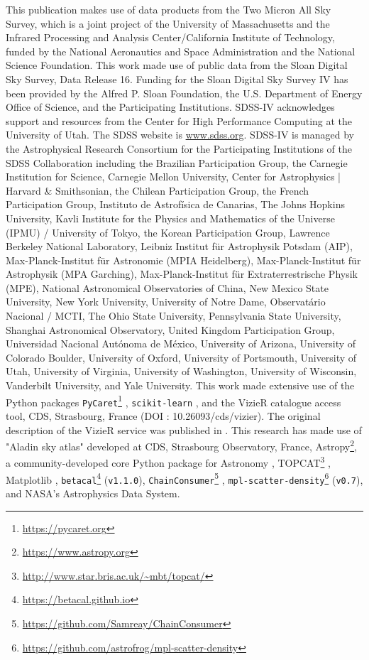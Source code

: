\documentclass{aa}
\begin{document}
\begin{acknowledgements}
This publication makes use of data products from the Two Micron All Sky Survey, which is a joint project of the University of Massachusetts and the Infrared Processing and Analysis Center/California Institute of Technology, funded by the National Aeronautics and Space Administration and the National Science Foundation.
This work made use of public data from the Sloan Digital Sky Survey, Data Release 16. Funding for the Sloan Digital Sky Survey IV has been provided by the Alfred P. Sloan Foundation, the U.S. Department of Energy Office of Science, and the Participating Institutions. 
SDSS-IV acknowledges support and resources from the Center for High Performance Computing  at the University of Utah. The SDSS website is \url{www.sdss.org}.
SDSS-IV is managed by the Astrophysical Research Consortium for the Participating Institutions of the SDSS Collaboration including the Brazilian Participation Group, the Carnegie Institution for Science, Carnegie Mellon University, Center for Astrophysics | Harvard \& Smithsonian, the Chilean Participation Group, the French Participation Group, Instituto de Astrof\'isica de Canarias, The Johns Hopkins University, Kavli Institute for the Physics and Mathematics of the Universe (IPMU) / University of Tokyo, the Korean Participation Group, Lawrence Berkeley National Laboratory, Leibniz Institut f\"ur Astrophysik Potsdam (AIP),  Max-Planck-Institut f\"ur Astronomie (MPIA Heidelberg), Max-Planck-Institut f\"ur Astrophysik (MPA Garching), Max-Planck-Institut f\"ur Extraterrestrische Physik (MPE), National Astronomical Observatories of China, New Mexico State University, New York University, University of Notre Dame, Observat\'ario Nacional / MCTI, The Ohio State University, Pennsylvania State University, Shanghai Astronomical Observatory, United Kingdom Participation Group, Universidad Nacional Aut\'onoma de M\'exico, University of Arizona, University of Colorado Boulder, University of Oxford, University of Portsmouth, University of Utah, University of Virginia, University of Washington, University of Wisconsin, Vanderbilt University, and Yale University.
This work made extensive use of the Python packages \verb|PyCaret|\footnote{\url{https://pycaret.org}} \citep[\texttt{v2.3.10};][]{PyCaret}, \verb|scikit-learn| \citep[\texttt{v0.23.2};][]{scikit-learn}, and the VizieR catalogue access tool, CDS, Strasbourg, France (DOI : 10.26093/cds/vizier). The original description of the VizieR service was published in \cite{vizier}.
This research has made use of "Aladin sky atlas" \citep[\texttt{v11.0.24};][]{2000A&AS..143...33B} developed at CDS, Strasbourg Observatory, France, Astropy\footnote{\url{https://www.astropy.org}}, a community-developed core Python package for Astronomy \citep[\texttt{v5.0};][]{astropy:2013, astropy:2018, 2022ApJ...935..167A}, TOPCAT\footnote{\url{http://www.star.bris.ac.uk/~mbt/topcat/}} \citep{2005ASPC..347...29T}, Matplotlib \citep[\texttt{v3.5.1};][]{Hunter:2007}, \verb|betacal|\footnote{\url{https://betacal.github.io}} (\texttt{v1.1.0}), \verb|ChainConsumer|\footnote{\url{https://github.com/Samreay/ChainConsumer}} \citep[\texttt{v0.34};][]{Hinton2016}, \verb|mpl-scatter-density|\footnote{\url{https://github.com/astrofrog/mpl-scatter-density}} (\texttt{v0.7}), and NASA’s Astrophysics Data System.

\end{acknowledgements}
\end{document}
